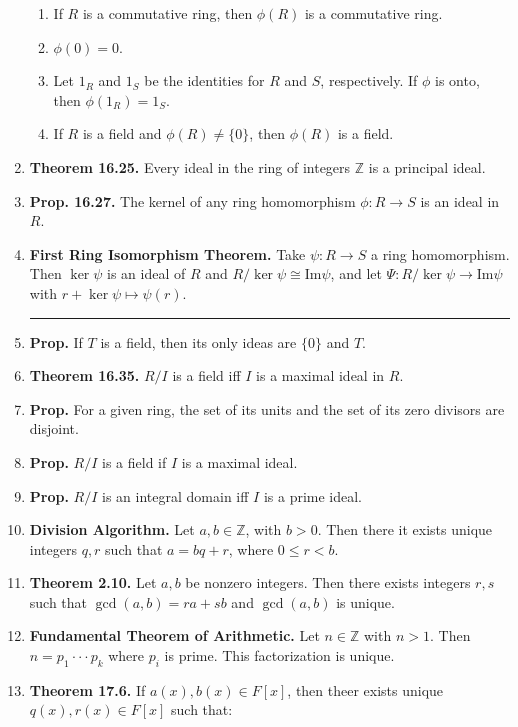 \begin{enumerate}
\begin{enumerate}
            \item If $R$ is a commutative ring, then $\phi(R)$ is a commutative ring. 
            \item $\phi(0)=0$. 
            \item Let $1_R$ and $1_S$ be the identities for $R$ and $S$, respectively. If $\phi$ is onto, then $\phi(1_R) = 1_S$. 
            \item If $R$ is a field and $\phi(R) \neq \{0\}$, then $\phi(R)$ is a field. 
        \end{enumerate}
        \item \textbf{Theorem 16.25. } Every ideal in the ring of integers $\mathbb{Z}$ is a principal ideal. 
        \item \textbf{Prop. 16.27. } The kernel of any ring homomorphism $\phi: R \to S$ is an ideal in $R$. 
	\item \textbf{First Ring Isomorphism Theorem. } Take $\psi: R \to S$ a ring homomorphism. Then $\ker\psi$ is an ideal of $R$ and $R/\ker\psi \cong \textrm{Im}\psi$, and let $\Psi: R/\ker\psi \to \textrm{Im}\psi$ with $r + \ker\psi \mapsto \psi(r)$. 
	\begin{center}
		\hrule
	\end{center}
	\item \textbf{Prop. } If $T$ is a field, then its only ideas are $\{0\}$ and $T$. 
	\item \textbf{Theorem 16.35. } $R/I$ is a field iff $I$ is a maximal ideal in $R$. 
	\item \textbf{Prop. } For a given ring, the set of its units and the set of its zero divisors are disjoint. 
	\item \textbf{Prop. } $R/I$ is a field if $I$ is a maximal ideal. 
	\item \textbf{Prop. } $R/I$ is an integral domain iff $I$ is a prime ideal. 
	\item \textbf{Division Algorithm. } Let $a,b \in \mathbb{Z}$, with $b>0$. Then there it exists unique integers $q,r$ such that $a=bq+r$, where $0 \leq r < b$. 
	\item \textbf{Theorem 2.10. } Let $a,b$ be nonzero integers. Then there exists integers $r,s$ such that $\gcd(a,b)=ra+sb$ and $\gcd(a,b)$ is unique. 
	\item \textbf{Fundamental Theorem of Arithmetic. } Let $n \in \mathbb{Z}$ with $n>1$. Then $n=p_1 \cdot \cdot \cdot p_k$ where $p_i$ is prime. This factorization is unique. 
	\item \textbf{Theorem 17.6. } If $a(x),b(x) \in F[x]$, then theer exists unique $q(x),r(x) \in F[x]$ such that: 

\end{enumerate}
